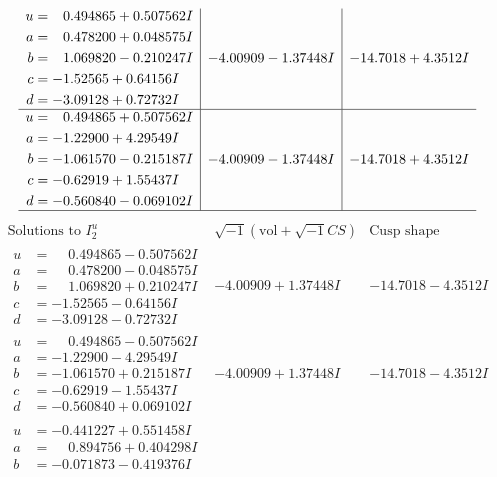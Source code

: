 \documentclass[1p]{elsarticle_modified}
\theoremstyle{definition}
\newcommand{\I}{\sqrt{-1}}
\begin{document}
$$\begin{array}{c|c|c}
\begin{aligned}
u &= \phantom{-}0.494865 + 0.507562 I \\
a &= \phantom{-}0.478200 + 0.048575 I \\
b &= \phantom{-}1.069820 - 0.210247 I \\
c &= -1.52565 + 0.64156 I \\
d &= -3.09128 + 0.72732 I\end{aligned}
 & -4.00909 - 1.37448 I & -14.7018 + 4.3512 I \\ \hline\begin{aligned}
u &= \phantom{-}0.494865 + 0.507562 I \\
a &= -1.22900 + 4.29549 I \\
b &= -1.061570 - 0.215187 I \\
c &= -0.62919 + 1.55437 I \\
d &= -0.560840 - 0.069102 I\end{aligned}
 & -4.00909 - 1.37448 I & -14.7018 + 4.3512 I\\
 \hline 
 \end{array}$$\newpage$$\begin{array}{c|c|c}  
\text{Solutions to }I^u_{2}& \I (\text{vol} + \sqrt{-1}CS) & \text{Cusp shape}\\
 \hline 
\begin{aligned}
u &= \phantom{-}0.494865 - 0.507562 I \\
a &= \phantom{-}0.478200 - 0.048575 I \\
b &= \phantom{-}1.069820 + 0.210247 I \\
c &= -1.52565 - 0.64156 I \\
d &= -3.09128 - 0.72732 I\end{aligned}
 & -4.00909 + 1.37448 I & -14.7018 - 4.3512 I \\ \hline\begin{aligned}
u &= \phantom{-}0.494865 - 0.507562 I \\
a &= -1.22900 - 4.29549 I \\
b &= -1.061570 + 0.215187 I \\
c &= -0.62919 - 1.55437 I \\
d &= -0.560840 + 0.069102 I\end{aligned}
 & -4.00909 + 1.37448 I & -14.7018 - 4.3512 I \\ \hline\begin{aligned}
u &= -0.441227 + 0.551458 I \\
a &= \phantom{-}0.894756 + 0.404298 I \\
b &= -0.071873 - 0.419376 I \\

\end{aligned}
\end{array}$$
\end{document}
